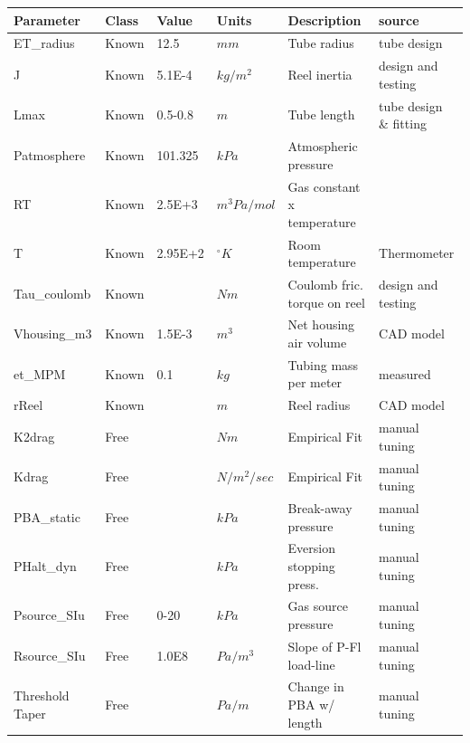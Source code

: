\documentclass[letterpaper]{article}
\begin{document}
\begin{table}
\begin{tabular}{l|l|l|l|l|l}
Parameter     &  Class     & Value   & Units     & Description      & source \\ \hline
ET\_radius     &  Known     & 12.5    &  $mm$       & Tube radius      & tube design \\
J             &  Known     & 5.1E-4 &  $kg/m^2$    & Reel inertia     & design and testing \cite{Lewis2024XX} \\
Lmax          &  Known     & 0.5-0.8 &  $m$        & Tube length      & tube design \& fitting \\
Patmosphere   &  Known     & 101.325 &  $kPa$      & Atmospheric pressure & \\
RT            &  Known     & 2.5E+3 &   $m^3 Pa/mol$   & Gas constant x temperature &  \\
T             &  Known     & 2.95E+2 &  $^\circ K$    & Room temperature   & Thermometer \\
Tau\_coulomb   &  Known     &        &  $Nm$       & Coulomb fric. torque on reel  & design and testing \cite{Lewis2024XX} \\
Vhousing\_m3   &  Known     &  1.5E-3&  $m^3$      & Net housing air volume  & CAD model \\
et\_MPM        &  Known     &  0.1    &  $kg$       & Tubing mass per meter  & measured \\
rReel         &  Known     &         &   $m$       & Reel radius & CAD model \\ \hline
K2drag        &  Free      &         &  $Nm$       & Empirical Fit    & manual tuning \\
Kdrag         &  Free      &         &  $N/m^2/sec$ & Empirical Fit & manual tuning \\
PBA\_static    &  Free      &         &  $kPa$      & Break-away pressure  & manual tuning \\
PHalt\_dyn     &  Free      &         &  $kPa$      & Eversion stopping press.  & manual tuning \\
Psource\_SIu   &  Free      & 0-20    &  $kPa$      & Gas source pressure & manual tuning\\
Rsource\_SIu   &  Free      & 1.0E8   &  $Pa/m^3$    & Slope of P-Fl load-line & manual tuning\\
Threshold Taper & Free     &          &  $Pa/m$      & Change in PBA w/ length   & manual tuning\\

\end{tabular}
\end{table}
\end{document}
